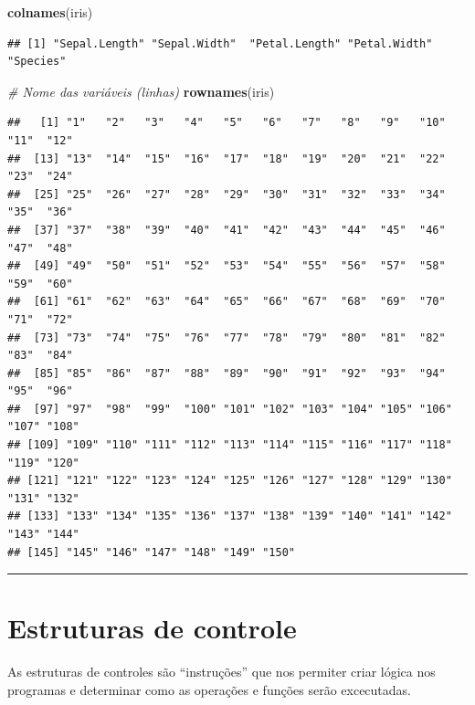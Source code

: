 \documentclass[
]{book}
\newenvironment{Shaded}{\begin{snugshade}}{\end{snugshade}}
\newcommand{\CommentTok}[1]{\textcolor[rgb]{0.56,0.35,0.01}{\textit{#1}}}
\newcommand{\FunctionTok}[1]{\textcolor[rgb]{0.13,0.29,0.53}{\textbf{#1}}}
\newcommand{\NormalTok}[1]{#1}
\begin{document}
\begin{Shaded}
\begin{Highlighting}[]
\FunctionTok{colnames}\NormalTok{(iris)}
\end{Highlighting}
\end{Shaded}

\begin{verbatim}
## [1] "Sepal.Length" "Sepal.Width"  "Petal.Length" "Petal.Width"  "Species"
\end{verbatim}

\begin{Shaded}
\begin{Highlighting}[]
\CommentTok{\# Nome das variáveis (linhas)}
\FunctionTok{rownames}\NormalTok{(iris)}
\end{Highlighting}
\end{Shaded}

\begin{verbatim}
##   [1] "1"   "2"   "3"   "4"   "5"   "6"   "7"   "8"   "9"   "10"  "11"  "12" 
##  [13] "13"  "14"  "15"  "16"  "17"  "18"  "19"  "20"  "21"  "22"  "23"  "24" 
##  [25] "25"  "26"  "27"  "28"  "29"  "30"  "31"  "32"  "33"  "34"  "35"  "36" 
##  [37] "37"  "38"  "39"  "40"  "41"  "42"  "43"  "44"  "45"  "46"  "47"  "48" 
##  [49] "49"  "50"  "51"  "52"  "53"  "54"  "55"  "56"  "57"  "58"  "59"  "60" 
##  [61] "61"  "62"  "63"  "64"  "65"  "66"  "67"  "68"  "69"  "70"  "71"  "72" 
##  [73] "73"  "74"  "75"  "76"  "77"  "78"  "79"  "80"  "81"  "82"  "83"  "84" 
##  [85] "85"  "86"  "87"  "88"  "89"  "90"  "91"  "92"  "93"  "94"  "95"  "96" 
##  [97] "97"  "98"  "99"  "100" "101" "102" "103" "104" "105" "106" "107" "108"
## [109] "109" "110" "111" "112" "113" "114" "115" "116" "117" "118" "119" "120"
## [121] "121" "122" "123" "124" "125" "126" "127" "128" "129" "130" "131" "132"
## [133] "133" "134" "135" "136" "137" "138" "139" "140" "141" "142" "143" "144"
## [145] "145" "146" "147" "148" "149" "150"
\end{verbatim}

\begin{center}\rule{0.5\linewidth}{0.5pt}\end{center}

\section{Estruturas de controle}\label{estruturas-de-controle}

As estruturas de controles são ``instruções'' que nos permiter criar lógica nos programas e determinar como as operações e funções serão excecutadas.
\end{document}
